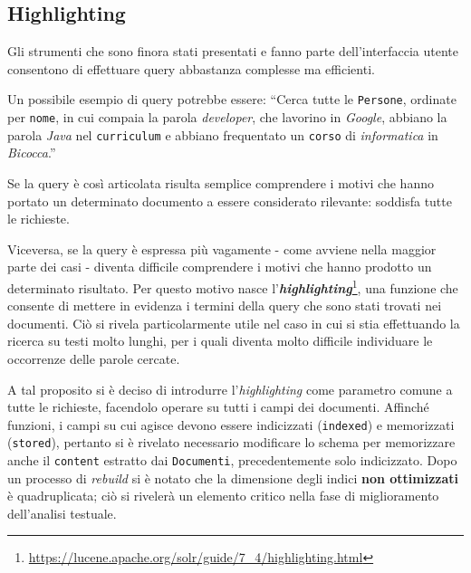 \subsection{Highlighting}

Gli strumenti che sono finora stati presentati e fanno parte dell’interfaccia utente consentono di effettuare query abbastanza complesse ma efficienti.

\vspace{1em}
Un possibile esempio di query potrebbe essere: 
“Cerca tutte le \texttt{Persone}, ordinate per \texttt{nome}, in cui compaia la parola \textit{developer}, che lavorino in \textit{Google}, abbiano la parola \textit{Java} nel \texttt{curriculum} e abbiano frequentato un \texttt{corso} di \textit{informatica} in \textit{Bicocca}.”
\vspace{0.5em}

\noindent Se la query è così articolata risulta semplice comprendere i motivi che hanno portato un determinato documento a essere considerato rilevante: soddisfa tutte le richieste. 

\vspace{1em}
Viceversa, se la query è espressa più vagamente - come avviene nella maggior parte dei casi - diventa difficile comprendere i motivi che hanno prodotto un determinato risultato. Per questo motivo nasce l’\textbf{\textit{highlighting}}\footnote{\url{https://lucene.apache.org/solr/guide/7_4/highlighting.html}}, una funzione che consente di mettere in evidenza i termini della query che sono stati trovati nei documenti. Ciò si rivela particolarmente utile nel caso in cui si stia effettuando la ricerca su testi molto lunghi, per i quali diventa molto difficile individuare le occorrenze delle parole cercate.

A tal proposito si è deciso di introdurre l’\textit{highlighting} come parametro comune a tutte le richieste, facendolo operare su tutti i campi dei documenti. Affinché funzioni, i campi su cui agisce devono essere indicizzati (\texttt{indexed}) e memorizzati (\texttt{stored}), pertanto si è rivelato necessario modificare lo schema per memorizzare anche il \texttt{content} estratto dai \texttt{Documenti}, precedentemente solo indicizzato. Dopo un processo di \textit{rebuild} si è notato che la dimensione degli indici \textbf{non ottimizzati} è quadruplicata; ciò si rivelerà un elemento critico nella fase di miglioramento dell’analisi testuale.

